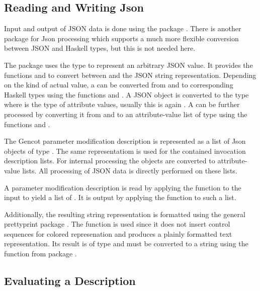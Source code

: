 \subsection{Reading and Writing Json}
\label{impl-parmod-json}

Input and output of JSON data is done using the package . There is another package  for
Json processing which supports a much more flexible conversion between JSON and Haskell types, but this is not
needed here.

The package  uses the type  to represent an arbitrary JSON value. It provides the functions
 and  to convert between  and the JSON string representation. Depending
on the kind of actual value, a  can be converted from and to corresponding Haskell types using
the functions  and . A JSON object is converted to the type  where
 is the type of attribute values, usually this is again . A  can be further
processed by converting it from and to an attribute-value list of type \code{[(String,a)]} using the functions
 and .

The Gencot parameter modification description is represented as a list of Json objects of type .
The same representatiom is used for the contained invocation description lists. For internal processing the objects
are converted to attribute-value lists. All processing of JSON data is directly performed on these lists.

A parameter modification description is read by applying the  function to the input to yield a
list of . It is output by applying the  function to such a list. 

Additionally,
the resulting string representation is formatted using the general prettyprint package .
The function  is used since it does not insert control sequences for colored represenation
and produces a plainly formatted text representation. Its result is of type  and must be converted to a
string using the function  from package .

\subsection{Evaluating a Description}
\label{impl-parmod-eval}

